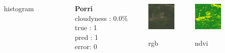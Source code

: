 \documentclass[c]{beamer}
\begin{document}
\begin{frame}
{\begin{columns}
\begin{column}{0.12\textwidth}
\begin{overlayarea}{\linewidth}{1.3cm}
  \end{overlayarea}
  \begin{overlayarea}{\linewidth}{0.5cm}
    \centering
    \tiny histogram \par
  \end{overlayarea}
 \end{column}
 
 
 \begin{column}{0.07\textwidth}
 \end{column}
 
 \begin{column}{0.12\textwidth}
 \textbf{Porri}\\
 cloudyness : 0.0\%\\
 true : 1\\
 pred : 1\\
 error: 0\\
 \end{column}
 \begin{column}{0.1\textwidth}
  \begin{overlayarea}{\linewidth}{1.3cm}
    \centering\vfill
    \includegraphics[scale=0.60]{images/Porri/08_rgb.png}
  \end{overlayarea}
  \begin{overlayarea}{\linewidth}{0.5cm}
    \centering
    \tiny rgb \par
  \end{overlayarea}
 \end{column}
 \begin{column}{0.1\textwidth}
  \begin{overlayarea}{\linewidth}{1.3cm}
    \centering\vfill
    \includegraphics[scale=0.60]{images/Porri/08_ndvi.png}
  \end{overlayarea}
  \begin{overlayarea}{\linewidth}{0.5cm}
    \centering
    \tiny ndvi \par
  \end{overlayarea}
 \end{column}
 \begin{column}{0.12\textwidth}
  \begin{overlayarea}{\linewidth}{1.3cm}

\end{overlayarea}
\end{column}
\end{columns}}
\end{frame}
\end{document}

